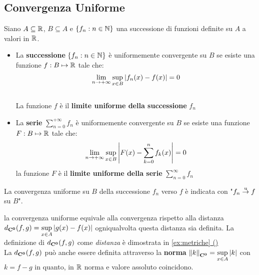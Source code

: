 \subsection{Convergenza Uniforme}\label{sect:conv_unif}
\begin{definition}
	\label{def:conv_unif}
	Siano $A\subseteq \mathbb{R}$, $B\subseteq A$ e $\left\{f_n:n\in\mathbb{N}\right\}$ una successione di funzioni definite su $A$ a valori in $\mathbb{R}$.
	\begin{itemize}
		\item La \textbf{successione} $\left\{f_n:n\in \mathbb{N}\right\}$ è uniformemente convergente su $B$ se esiste una funzione $f:B\mapsto \mathbb{R}$ tale che:
		\[\lim\limits_{n \to +\infty} \sup\limits_{x\in B}\left|f_n(x)-f(x)\right|=0\]\\
		La funzione $f$ è il \textbf{limite uniforme della successione} $f_n$
		\item La \textbf{serie} $\sum\limits_{n=0}^{+\infty}f_n$ è uniformemente convergente su $B$ se esiste una funzione $F:B\mapsto \mathbb{R}$ tale che:
		\[\lim\limits_{n\to +\infty} \sup\limits_{x\in B}\left|F(x)-\sum\limits_{k=0}^n f_k(x)\right|=0\]
		la funzione $F$ è il \textbf{limite uniforme della serie} $\sum\limits_{n=0}^{\infty}f_n$
	\end{itemize}
	La convergenza uniforme su $B$ della successione $f_n$ verso $f$ è indicata con "$f_n \overset{\text{u}}{\to} f$ su $B$".
\end{definition}
\begin{observation}
	\label{obs:dist_conv_unif}
	la convergenza uniforme equivale alla convergenza rispetto alla distanza $d_{\mathbf{C^{0}}}(f,g)=\sup\limits_{x\in A}\left|g(x)-f(x)\right|$ ogniqualvolta questa distanza sia definita. La definizione di $d_{\mathbf{C^{0}}}(f,g)$ come \textit{distanza} è dimostrata in \hyperref[ex:dim_dist_conv_unif]{\cref*{ex:metriche} ()}\\
	La $d_{\mathbf{C^{0}}}(f,g)$ può anche essere definita attraverso la \textbf{norma} $\left\|k\right\|_{\mathbf{C^{0}}}=\sup\limits_{x\in A}\left|k\right|$ con $k = f-g$ in quanto, in $\mathbb{R}$ norma e valore assoluto coincidono.
\end{observation}
\begin{proposition}
	\label{prop:dist_lin_non_cont}
\end{proposition}
\begin{example}
	\label{ex:BBBBBBBBBB}
\end{example}


